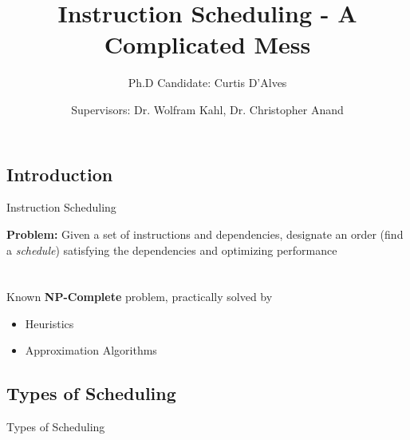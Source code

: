 \documentclass{beamer}
\title{\normalsize Instruction Scheduling - A Complicated Mess} %
\subtitle{Ph.D Candidate: Curtis D'Alves} %
\author{Supervisors: Dr. Wolfram Kahl, Dr. Christopher Anand}
\begin{document}
  \frame{\maketitle}


  \begin{darkframes}
    \section{Introduction}
\begin{frame}{Instruction Scheduling}

	{\color{cyan} \bf Problem:} Given a set of instructions and dependencies, designate an order (find a {\it schedule}) satisfying the dependencies and optimizing performance
	\pause
	\qquad \\
	\qquad \\
	\qquad \\
	Known {\bf \color{green} NP-Complete} problem, practically solved by
	\begin{itemize}
		\item Heuristics
		\item Approximation Algorithms
	\end{itemize}
\end{frame}      

\subsection{Types of Scheduling}
\begin{frame}{Types of Scheduling}


\end{frame}
\end{darkframes}
\end{document}
